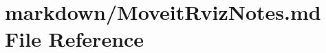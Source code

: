 \hypertarget{MoveitRvizNotes_8md}{\section{markdown/\-Moveit\-Rviz\-Notes.md File Reference}
\label{MoveitRvizNotes_8md}
}
